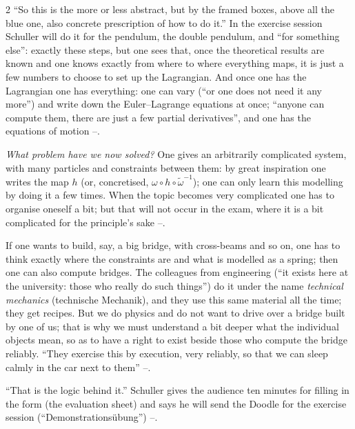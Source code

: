 \begin{paracol}{2}
``So this is the more or less abstract, but by the framed boxes, above all the blue one, also concrete prescription of how to do it.'' In the exercise session Schuller will do it for the pendulum, the double pendulum, and ``for something else'': exactly these steps, but one sees that, once the theoretical results are known and one knows exactly from where to where everything maps, it is just a few numbers to choose to set up the Lagrangian. And once one has the Lagrangian one has everything: one can vary (``or one does not need it any more'') and write down the Euler--Lagrange equations at once; ``anyone can compute them, there are just a few partial derivatives'', and one has the equations of motion --.

\emph{What problem have we now solved?} One gives an arbitrarily complicated system, with many particles and constraints between them: by great inspiration one writes the map $h$ (or, concretised, $\omega\circ h\circ\tilde\omega^{-1}$); one can only learn this modelling by doing it a few times. When the topic becomes very complicated one has to organise oneself a bit; but that will not occur in the exam, where it is a bit complicated for the principle's sake --.

\begin{aside}\label{as:zw-bridge}
If one wants to build, say, a big bridge, with cross-beams and so on, one has to think exactly where the constraints are and what is modelled as a spring; then one can also compute bridges. The colleagues from engineering (``it exists here at the university: those who really do such things'') do it under the name \emph{technical mechanics} (technische Mechanik), and they use this same material all the time; they get recipes. But we do physics and do not want to drive over a bridge built by one of us; that is why we must understand a bit deeper what the individual objects mean, so as to have a right to exist beside those who compute the bridge reliably. ``They exercise this by execution, very reliably, so that we can sleep calmly in the car next to them'' --.
\end{aside}

\begin{coursenote}\label{cn:zw-end}
``That is the logic behind it.'' Schuller gives the audience ten minutes for filling in the form (the evaluation sheet) and says he will send the Doodle for the exercise session (``Demonstrationsübung'') --.
\end{coursenote}


\end{paracol}
